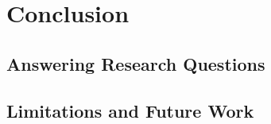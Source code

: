 
\chapter{Conclusion} %



\ifpdf
    \graphicspath{{8_conclusion/figures/PNG/}{8_conclusion/figures/PDF/}{8_conclusion/figures/}}
\else
    \graphicspath{{8_conclusion/figures/EPS/}{8_conclusion/figures/}}
\fi


% 

\section{Answering Research Questions}

\section{Limitations and Future Work}



